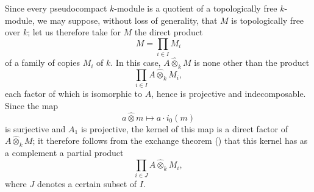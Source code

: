 Since every pseudocompact \(k\)-module is a quotient of a
topologically free \(k\)-module, we may suppose, without loss of
generality, that \(M\) is topologically free over \(k\); let us therefore
take for \(M\) the direct product
\[
  M=\prod_{i\in I}M_i
\]
of a family of copies \(M_i\) of \(k\). In this case,
\(A\widehat{\otimes}_kM\) is none other than the product
\[
  \prod_{i\in I}
  A\widehat{\otimes}_kM_i,
\]
each factor of which is isomorphic to \(A\), hence is projective and
indecomposable. Since the map
\[
  a\widehat{\otimes}m\longmapsto a\cdot i_0(m)
\]
is surjective and \(A_1\) is projective, the kernel of this map is a
direct factor of \(A\widehat{\otimes}_kM\); it therefore follows from
the exchange theorem \textup{()} that this kernel has as a
complement a partial product
\[
  \prod_{i\in J}A\widehat{\otimes}_kM_i,
\]
where \(J\) denotes a certain subset of \(I\).

